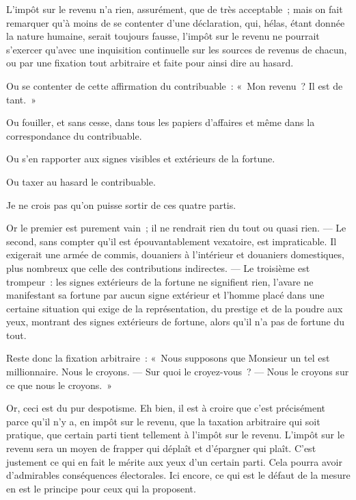 \documentclass[french,twoside]{book} %
\begin{document}
\noindent L’impôt sur le revenu n’a rien, assurément, que de très acceptable ; mais on fait remarquer qu’à moins de se contenter d’une déclaration, qui, hélas, étant donnée la nature humaine, serait toujours fausse, l’impôt sur le revenu ne pourrait s’exercer qu’avec une inquisition continuelle sur les sources de revenus de chacun, ou par une fixation tout arbitraire et faite pour ainsi dire au hasard.\par
Ou se contenter de cette affirmation du contribuable : « Mon revenu ? Il est de tant. »\par
Ou fouiller, et sans cesse, dans tous les papiers d’affaires et même dans la correspondance du contribuable.\par
Ou s’en rapporter aux signes visibles et extérieurs de la fortune.\par
 Ou taxer au hasard le contribuable.\par
Je ne crois pas qu’on puisse sortir de ces quatre partis.\par
Or le premier est purement vain ; il ne rendrait rien du tout ou quasi rien. — Le second, sans compter qu’il est épouvantablement vexatoire, est impraticable. Il exigerait une armée de commis, douaniers à l’intérieur et douaniers domestiques, plus nombreux que celle des contributions indirectes. — Le troisième est trompeur : les signes extérieurs de la fortune ne signifient rien, l’avare ne manifestant sa fortune par aucun signe extérieur et l’homme placé dans une certaine situation qui exige de la représentation, du prestige et de la poudre aux yeux, montrant des signes extérieurs de fortune, alors qu’il n’a pas de fortune du tout.\par
Reste donc la fixation arbitraire : « Nous supposons que Monsieur un tel est millionnaire. Nous le croyons. — Sur quoi le croyez-vous ? — Nous le croyons sur ce que nous le croyons. »\par
Or, ceci est du pur despotisme. Eh bien, il est à croire que c’est précisément parce qu’il n’y a, en impôt sur le revenu, que la taxation arbitraire qui soit pratique, que certain parti tient tellement à l’impôt sur le revenu. L’impôt sur le revenu sera un moyen de frapper qui déplaît et d’épargner qui plaît. C’est justement ce qui en fait le mérite aux  yeux d’un certain parti. Cela pourra avoir d’admirables conséquences électorales. Ici encore, ce qui est le défaut de la mesure en est le principe pour ceux qui la proposent.\par
\end{document}

